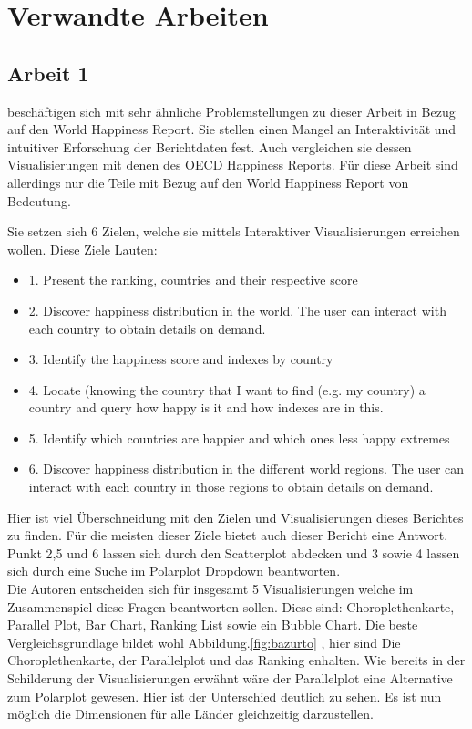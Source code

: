 \section{Verwandte Arbeiten}

\subsection{Arbeit 1}
\textcite{bazurto2019} beschäftigen sich mit sehr ähnliche Problemstellungen zu dieser Arbeit in Bezug auf den World Happiness Report. Sie stellen einen Mangel an Interaktivität und intuitiver Erforschung der Berichtdaten fest. Auch vergleichen sie dessen Visualisierungen mit denen des OECD Happiness Reports. Für diese Arbeit sind allerdings nur die Teile mit Bezug auf den World Happiness Report von Bedeutung. 

Sie setzen sich 6 Zielen, welche sie mittels Interaktiver Visualisierungen erreichen wollen. Diese Ziele Lauten:

\begin{itemize}
\item 1. Present the ranking, countries and their respective score

\item 2. Discover happiness distribution in the world. The user can interact with each country to obtain details on demand.
\item 3. Identify the happiness score and indexes by country

\item 4. Locate (knowing the country that I want to find (e.g. my country) a country and query how happy is it and how indexes are in this.

\item 5. Identify which countries are happier and which ones less happy extremes

\item 6. Discover happiness distribution in the different world regions. The user can interact with each country in those regions to obtain details on demand.
\end{itemize}

Hier ist viel Überschneidung mit den Zielen und Visualisierungen dieses Berichtes zu finden. Für die meisten dieser Ziele bietet auch dieser Bericht eine Antwort. Punkt 2,5 und 6 lassen sich durch den Scatterplot abdecken und 3 sowie 4 lassen sich durch eine Suche im Polarplot Dropdown beantworten. \\

Die Autoren entscheiden sich für insgesamt 5 Visualisierungen welche im Zusammenspiel diese Fragen beantworten sollen. Diese sind: Choroplethenkarte, Parallel Plot, Bar Chart, Ranking List sowie ein Bubble Chart. 
Die beste Vergleichsgrundlage bildet wohl Abbildung.\ref{fig:bazurto} , hier sind 
Die Choroplethenkarte, der Parallelplot und das Ranking enhalten. 
Wie bereits in der Schilderung der Visualisierungen erwähnt wäre der Parallelplot eine Alternative zum Polarplot gewesen. Hier ist der Unterschied deutlich zu sehen.
Es ist nun möglich die Dimensionen für alle Länder gleichzeitig darzustellen.\\

